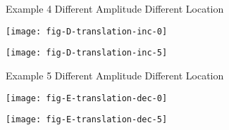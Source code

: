 \documentclass{slides}
\begin{document}
\begin{center}
    \begin{slide}
        {\Huge Example 4} \vspace{1em}\break
        Different Amplitude \break
        Different Location
    \end{slide}
    \begin{slide}
        \texttt{[image: fig-D-translation-inc-0]}
    \end{slide}
    \begin{slide}
        \texttt{[image: fig-D-translation-inc-5]}
    \end{slide}


    \begin{slide}
        {\Huge Example 5} \vspace{1em}\break
        Different Amplitude \break
        Different Location
    \end{slide}
    \begin{slide}
        \texttt{[image: fig-E-translation-dec-0]}
    \end{slide}
    \begin{slide}
        \texttt{[image: fig-E-translation-dec-5]}
    \end{slide}

\end{center} 
\end{document}
